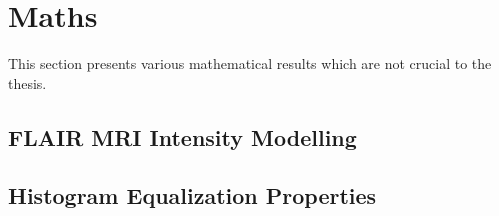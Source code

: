 \chapter{Maths}
This section presents various mathematical results which are not crucial to the thesis.
\section{FLAIR MRI Intensity Modelling}\label{s:flairmodel}

\section{Histogram Equalization Properties}




